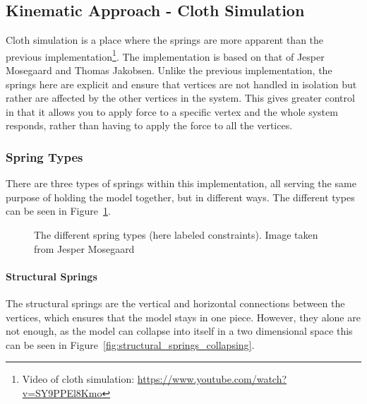 \subsection{Kinematic Approach - Cloth Simulation}
Cloth simulation is a place where the springs are more apparent than the previous implementation\footnote{Video of cloth simulation: \url{https://www.youtube.com/watch?v=SY9PPEl8Kmo}}. 
The implementation is based on that of Jesper Mosegaard\cite{mosegaards_clothing_simulation} and Thomas Jakobsen\cite{jakobsen_advanced_character_physics}.
Unlike the previous implementation, the springs here are explicit and ensure that vertices are not handled in isolation but rather are affected by the other vertices in the system.
This gives greater control in that it allows you to apply force to a specific vertex and the whole system responds, rather than having to apply the force to all the vertices.

\subsubsection{Spring Types}
There are three types of springs within this implementation, all serving the same purpose of holding the model together,
but in different ways. The different types can be seen in Figure~\ref{fig:spring_types}.
\begin{figure}
    \centering
    \caption{The different spring types (here labeled constraints). Image taken from Jesper Mosegaard\cite{mosegaards_clothing_simulation}}
    \label{fig:spring_types}
\end{figure}

\paragraph{Structural Springs}
The structural springs are the vertical and horizontal connections between the vertices, which ensures that the model stays in one piece.
However, they alone are not enough, as the model can collapse into itself in a two dimensional space\cite{jeff_lander_real_time_cloth} this can be seen in Figure~\ref{fig:structural_springs_collapsing}.

